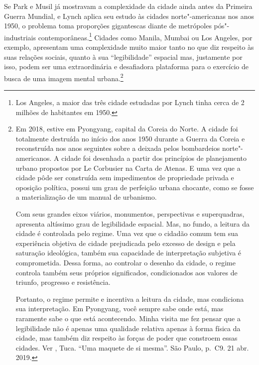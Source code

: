 Se Park e Musil já mostravam a complexidade da cidade ainda antes da
Primeira Guerra Mundial, e Lynch aplica seu estudo às cidades
norte"-americanas nos anos 1950, o problema toma proporções gigantescas
diante de metrópoles pós"-industriais contemporâneas.\footnote{Los
  Angeles, a maior das três cidade estudadas por Lynch tinha cerca de 2
  milhões de habitantes em 1950.} Cidades como Manila, Mumbai ou Los
Angeles, por exemplo, apresentam uma complexidade muito maior tanto no
que diz respeito às suas relações sociais, quanto à sua ``legibilidade''
espacial mas, justamente por isso, podem ser uma extraordinária e
desafiadora plataforma para o exercício de busca de uma imagem mental
urbana.\footnote{Em 2018, estive em Pyongyang, capital da Coreia do
  Norte. A cidade foi totalmente destruída no início dos anos 1950
  durante a Guerra da Coreia e reconstruída nos anos seguintes sobre a
  {} deixada pelos bombardeios norte"-americanos. A cidade
  foi desenhada a partir dos princípios de planejamento urbano propostos
  por Le Corbusier na Carta de Atenas. E uma vez que a cidade pôde ser
  construída sem impedimentos de propriedade privada e oposição
  política, possui um grau de perfeição urbana chocante, como se fosse a
  materialização de um manual de urbanismo.

  Com seus grandes eixos viários, monumentos, perspectivas e
  superquadras, apresenta altíssimo grau de legibilidade espacial. Mas,
  no fundo, a leitura da cidade é controlada pelo regime. Uma vez que o
  cidadão comum tem sua experiência objetiva de cidade prejudicada pelo
  excesso de design e pela saturação ideológica, também sua capacidade
  de interpretação subjetiva é comprometida. Dessa forma, ao controlar o
  desenho da cidade, o regime controla também seus próprios
  significados, condicionados aos valores de triunfo, progresso e
  resistência.

  Portanto, o regime permite e incentiva a leitura da cidade, mas
  condiciona sua interpretação. Em Pyongyang, você sempre sabe onde
  está, mas raramente sabe o que está acontecendo. Minha visita me fez
  pensar que a legibilidade não é apenas uma qualidade relativa apenas à
  forma física da cidade, mas também diz respeito às forças de poder que
  constroem essas cidades. Ver , Tuca. ``Uma maquete de si
  mesma''. {} São Paulo, p.~C9. 21 abr. 2019.}

